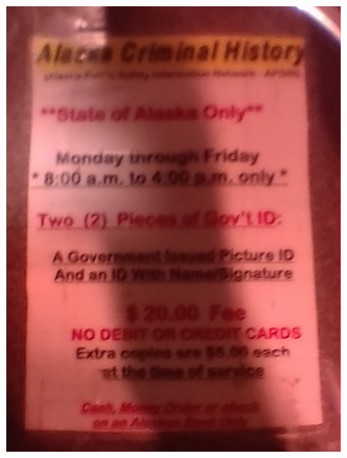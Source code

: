 \documentclass[letterpaper]{article}
\begin{document}
\begin{figure}
\noindent\begin{minipage}{0.45\textwidth}\centering
	\includegraphics[width=1.0\textwidth]{IMG_20171206_151214.jpg}
	\end{minipage}\textwidth\begin{minipage}{0.45\textwidth}\centering

\end{minipage}
\end{figure}
\end{document}
